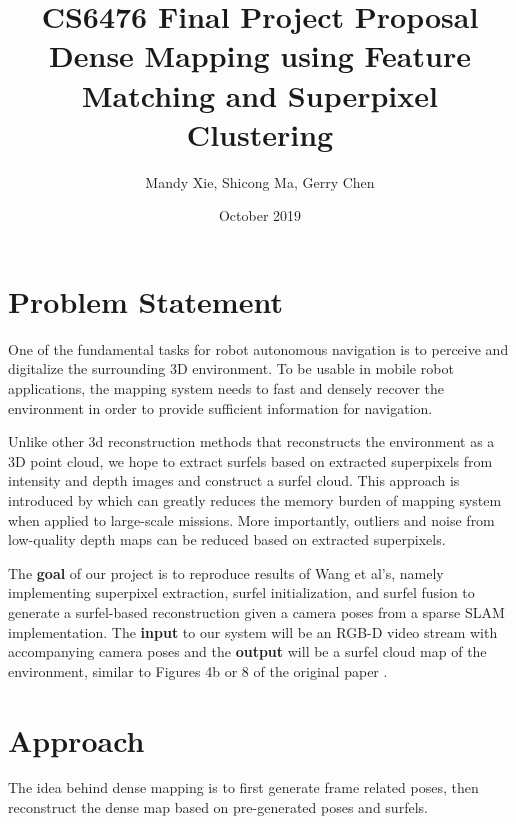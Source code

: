 \documentclass{article}
\title{\vspace*{-0.5in}CS6476 Final Project Proposal\\Dense Mapping using Feature Matching and Superpixel Clustering}
\author{Mandy Xie, Shicong Ma, Gerry Chen}
\date{October 2019}
\begin{document}
\maketitle

\section{Problem Statement}
One of the fundamental tasks for robot autonomous navigation is to perceive and digitalize the surrounding 3D environment\cite{handa2014benchmark}. To be usable in mobile robot applications, the mapping system needs to fast and densely recover the environment in order to provide sufficient information for navigation.

Unlike other 3d reconstruction methods that reconstructs the environment as a 3D point cloud, we hope to extract surfels \cite{schops2018surfelmeshing, pfister2000surfels, tobor2000rendering} based on extracted superpixels from intensity and depth images and construct a surfel cloud. This approach is introduced by \cite{Wang19icra_surfelDense} which can greatly reduces the memory burden of mapping system when applied to large-scale missions. More importantly, outliers and noise from low-quality depth maps can be reduced based on extracted superpixels.

The \textbf{goal} of our project is to reproduce results of Wang et al's, namely implementing superpixel extraction, surfel initialization, and surfel fusion to generate a surfel-based reconstruction given a camera poses from a sparse SLAM implementation.  The \textbf{input} to our system will be an RGB-D video stream with accompanying camera poses and the \textbf{output} will be a surfel cloud map of the environment, similar to Figures 4b or 8 of the original paper \cite{Wang19icra_surfelDense}.

\section{Approach}

The idea behind dense mapping is to first generate frame related poses, then reconstruct the dense map based on pre-generated poses and surfels.
\end{document}
